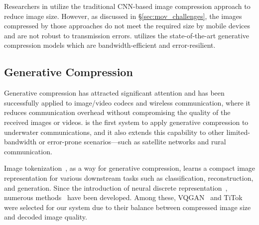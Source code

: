 Researchers in \cite{anjum2022deep,anjum2022acoustic} utilize the traditional CNN-based image compression approach to reduce image size. However, as discussed in \S\ref{sec:mov_challenges}, the images compressed by those approaches do not meet the required size by mobile devices and are not robust to transmission errors. \sysname utilizes the state-of-the-art generative compression models which are bandwidth-efficient and error-resilient.










\subsection{Generative Compression}
Generative compression has attracted significant attention \cite{grassucci2023generative,xie2021tsp,dai2023wc,anjum2022deep,le2023arxiv,li2024reparolossresilientgenerativecodec,NEURIPS2019_f1ea154c} and has been successfully applied to image/video codecs and wireless communication, where it reduces communication overhead without compromising the quality of the received images or videos.
\sysname is the first system to apply generative compression to underwater communications, and it also extends this capability to other limited-bandwidth or error-prone scenarios---such as satellite networks and rural communication.

Image tokenization~\cite{yan2024elastictokadaptivetokenizationimage,shen2025catcontentadaptiveimagetokenization}, as a way for generative compression, learns a compact image representation for various downstream tasks such as classification, reconstruction, and generation.
Since the introduction of neural discrete representation~\cite{van2017neural}, numerous methods~\cite{esser2020taming, yu2024image, yu2023language, yu2021vector} have been developed. Among these, VQGAN~\cite{esser2020taming} and TiTok~\cite{yu2024image} were selected for our system due to their balance between compressed image size and decoded image quality.




